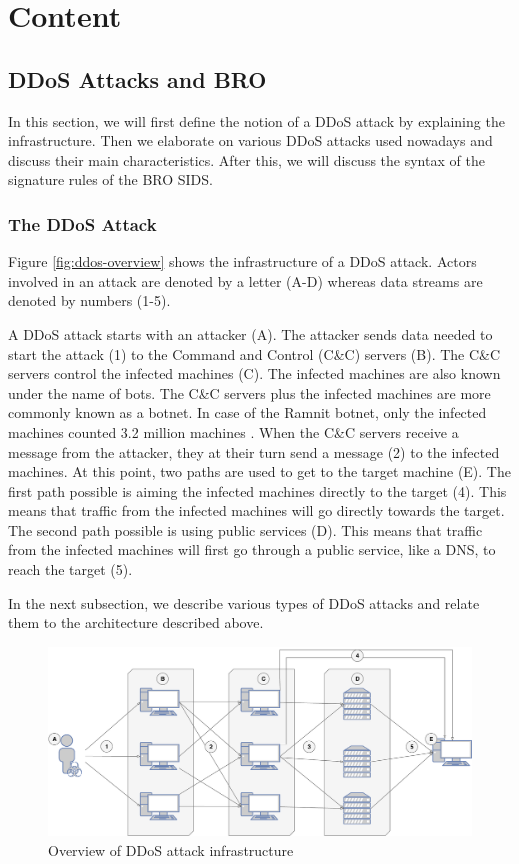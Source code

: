 \section{Content}
\label{section:content}

\subsection{DDoS Attacks and BRO}\label{subsec:ddos-and-bro}
In this section, we will first define the notion of a DDoS attack by explaining the infrastructure. Then we elaborate on various DDoS attacks used nowadays and discuss their main characteristics. After this, we will discuss the syntax of the signature rules of the BRO SIDS.

\subsubsection{The DDoS Attack}
Figure \ref{fig:ddos-overview} shows the infrastructure of a DDoS attack. Actors involved in an attack are denoted by a letter (A-D) whereas data streams are denoted by numbers (1-5). 

A DDoS attack starts with an attacker (A). The attacker sends data needed to start the attack (1) to the Command and Control (C\&C) servers (B). The C\&C servers control the infected machines (C). The infected machines are also known under the name of bots. The C\&C servers plus the infected machines are more commonly known as a botnet. In case of the Ramnit botnet, only the infected machines counted 3.2 million machines \cite{europol2015}. When the C\&C servers receive a message from the attacker, they at their turn send a message (2) to the infected machines. At this point, two paths are used to get to the target machine (E). The first path possible is aiming the infected machines directly to the target (4). This means that traffic from the infected machines will go directly towards the target. The second path possible is using public services (D). This means that traffic from the infected machines will first go through a public service, like a DNS, to reach the target (5). 

In the next subsection, we describe various types of DDoS attacks and relate them to the architecture described above. 

\begin{figure}[H]
\centering
\includegraphics[width=\textwidth]{./images/ddos-overview.pdf}
\caption{Overview of DDoS attack infrastructure}
\end{figure}\label{fig:ddos-overview}

